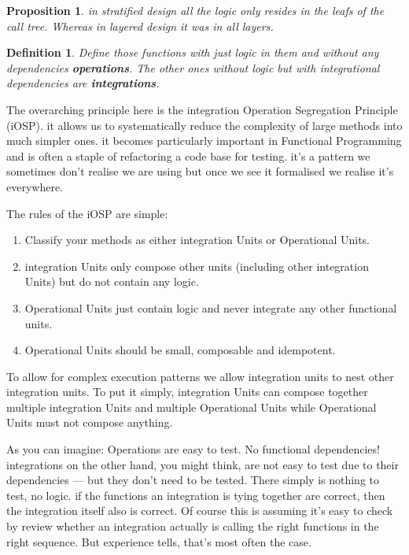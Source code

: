 \documentclass[a4paper,twoside]{article}
\newtheorem{proposition}[theorem]{Proposition}
\newtheorem{definition}[theorem]{Definition}
\numberwithin{equation}{section}
\begin{document}
\begin{proposition}
    in stratified design all the logic only resides in the leafs of the call tree. Whereas in layered design it was in all layers.
\end{proposition}

\begin{definition}
    Define those functions with just logic in them and without any dependencies \textbf{operations}. The other ones without logic but with integrational dependencies are \textbf{integrations}.
\end{definition}
The overarching principle here is the integration Operation Segregation Principle (iOSP). it allows us to systematically reduce the complexity of large methods into much simpler ones. it becomes particularly important in Functional Programming and is often a staple of refactoring a code base for testing. it's a pattern we sometimes don't realise we are using but once we see it formalised we realise it's everywhere.

The rules of the iOSP are simple:
\begin{enumerate}
    \item Classify your methods as either integration Units or Operational Units.
    \item integration Units only compose other units (including other integration Units) but do not contain any logic.
    \item Operational Units just contain logic and never integrate any other functional units.
    \item Operational Units should be small, composable and idempotent.
\end{enumerate}
To allow for complex execution patterns we allow integration units to nest other integration units. To put it simply, integration Units can compose together multiple integration Units and multiple Operational Units while Operational Units must not compose anything.

As you can imagine: Operations are easy to test. No functional dependencies! integrations on the other hand, you might think, are not easy to test due to their dependencies — but they don't need to be tested. There simply is nothing to test, no logic. if the functions an integration is tying together are correct, then the integration itself also is correct. Of course this is assuming it's easy to check by review whether an integration actually is calling the right functions in the right sequence. But experience tells, that's most often the case.
\end{document}
